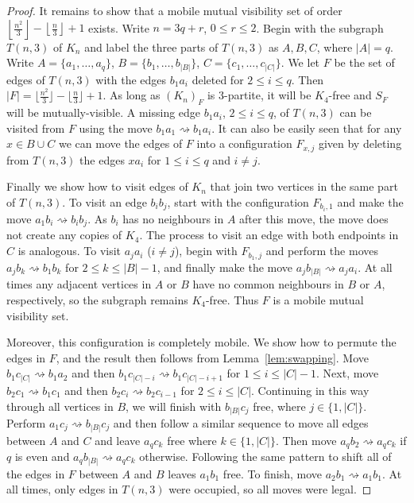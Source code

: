 \documentclass[a4paper,12pt]{article}
\theoremstyle{definition}
\newcommand{\move}{\rightsquigarrow}
\begin{document}
\begin{proof}
		
		
		It remains to show that a mobile mutual visibility set of order $\left \lfloor{\frac{n^2}{3}} \right \rfloor - \left \lfloor{\frac{n}{3}} \right \rfloor + 1$ exists. Write $n = 3q+r$, $0 \leq r \leq 2$. Begin with the subgraph $T(n,3)$ of $K_n$ and label the three parts of $T(n,3)$ as $A, B, C$, where $|A| = q$. Write $A = \{ a_1,\dots ,a_q\} $, $B = \{ b_1,\dots ,b_{|B|}\} $, $C = \{ c_1,\dots,c_{|C|} \} $. We let $F$ be the set of edges of $T(n,3)$ with the edges $b_1a_i$ deleted for $2 \leq i \leq q$. Then $|F| = \lfloor{\frac{n^2}{3}}\rfloor - \lfloor{\frac{n}{3}}\rfloor + 1$. As long as $(K_n)_F$ is $3$-partite, it will be $K_4$-free and $S_F$ will be mutually-visible. A missing edge $b_1a_i$, $2 \leq i \leq q$, of $T(n,3)$ can be visited from $F$ using the move $b_1a_1 \move b_1a_i$. It can also be easily seen that for any $x \in B \cup C$ we can move the edges of $F$ into a configuration $F_{x,j}$ given by deleting from $T(n,3)$ the edges $xa_i$ for $1 \leq i \leq q$ and $i \neq j$. 
		
		Finally we show how to visit edges of $K_n$ that join two vertices in the same part of $T(n,3)$. To visit an edge $b_ib_j$, start with the configuration $F_{b_i, 1}$ and make the move $a_1b_i \move b_ib_j$. As $b_i$ has no neighbours in $A$ after this move, the move does not create any copies of $K_4$. The process to visit an edge with both endpoints in $C$ is analogous. To visit $a_ja_i$ ($i \neq j$), begin with $F_{b_1,j}$ and perform the moves $a_jb_k \move b_1b_k$ for $2 \leq k \leq |B| - 1$, and finally make the move $a_jb_{|B|} \move a_ja_i$. At all times any adjacent vertices in $A$ or $B$ have no common neighbours in $B$ or $A$, respectively, so the subgraph remains $K_4$-free. Thus $F$ is a mobile mutual visibility set.
		
		Moreover, this configuration is completely mobile. We show how to permute the edges in $F$, and the result then follows from Lemma~\ref{lem:swapping}. Move $b_1c_{|C|} \move b_1a_2$ and then $b_1c_{|C| - i} \move b_1c_{|C| - i + 1}$ for $1 \leq i \leq |C| - 1$. Next, move $b_2c_1 \move b_1c_1$ and then $b_2c_i \move b_2c_{i-1}$ for $2 \leq i \leq |C|$. Continuing in this way through all vertices in $B$, we will finish with $b_{|B|}c_j$ free, where $j \in \{1, |C|\}$. Perform $a_1c_j \move b_{|B|}c_j$ and then follow a similar sequence to move all edges between $A$ and $C$ and leave $a_qc_k$ free where $k \in \{ 1, |C| \}$. Then move $a_qb_2 \move a_qc_k$ if $q$ is even and $a_qb_{|B|} \move a_qc_k$ otherwise. Following the same pattern to shift all of the edges in $F$ between $A$ and $B$ leaves $a_1b_1$ free. To finish, move $a_2b_1 \move a_1b_1$. At all times, only edges in $T(n,3)$ were occupied, so all moves were legal.
	\end{proof}
	
\end{document}
